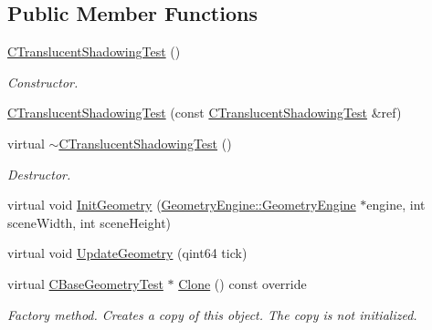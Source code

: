 \subsection*{Public Member Functions}
\begin{DoxyCompactItemize}
\item 
\mbox{\label{class_unit_test_1_1_c_translucent_shadowing_test_afb09a4e9bd7ee4213583cf86f50b0571}} 
\mbox{\hyperlink{class_unit_test_1_1_c_translucent_shadowing_test_afb09a4e9bd7ee4213583cf86f50b0571}{C\+Translucent\+Shadowing\+Test}} ()
\begin{DoxyCompactList}\small\item\em Constructor. \end{DoxyCompactList}\item 
\mbox{\hyperlink{class_unit_test_1_1_c_translucent_shadowing_test_ac2abacd427b29b315eea6d4e95ec2852}{C\+Translucent\+Shadowing\+Test}} (const \mbox{\hyperlink{class_unit_test_1_1_c_translucent_shadowing_test}{C\+Translucent\+Shadowing\+Test}} \&ref)
\item 
\mbox{\label{class_unit_test_1_1_c_translucent_shadowing_test_a3f78dd539f84eab088c448643b30b63a}} 
virtual \mbox{\hyperlink{class_unit_test_1_1_c_translucent_shadowing_test_a3f78dd539f84eab088c448643b30b63a}{$\sim$\+C\+Translucent\+Shadowing\+Test}} ()
\begin{DoxyCompactList}\small\item\em Destructor. \end{DoxyCompactList}\item 
virtual void \mbox{\hyperlink{class_unit_test_1_1_c_translucent_shadowing_test_a231fbde217715f805edd8afd71e46db4}{Init\+Geometry}} (\mbox{\hyperlink{class_geometry_engine_1_1_geometry_engine}{Geometry\+Engine\+::\+Geometry\+Engine}} $\ast$engine, int scene\+Width, int scene\+Height)
\item 
virtual void \mbox{\hyperlink{class_unit_test_1_1_c_translucent_shadowing_test_a6d0809018d48d6f3f9e80147b894da5d}{Update\+Geometry}} (qint64 tick)
\item 
\mbox{\label{class_unit_test_1_1_c_translucent_shadowing_test_a1930909bd48fc7abd12fae022fe86322}} 
virtual \mbox{\hyperlink{class_unit_test_1_1_c_base_geometry_test}{C\+Base\+Geometry\+Test}} $\ast$ \mbox{\hyperlink{class_unit_test_1_1_c_translucent_shadowing_test_a1930909bd48fc7abd12fae022fe86322}{Clone}} () const override
\begin{DoxyCompactList}\small\item\em Factory method. Creates a copy of this object. The copy is not initialized. \end{DoxyCompactList}\end{DoxyCompactItemize}
